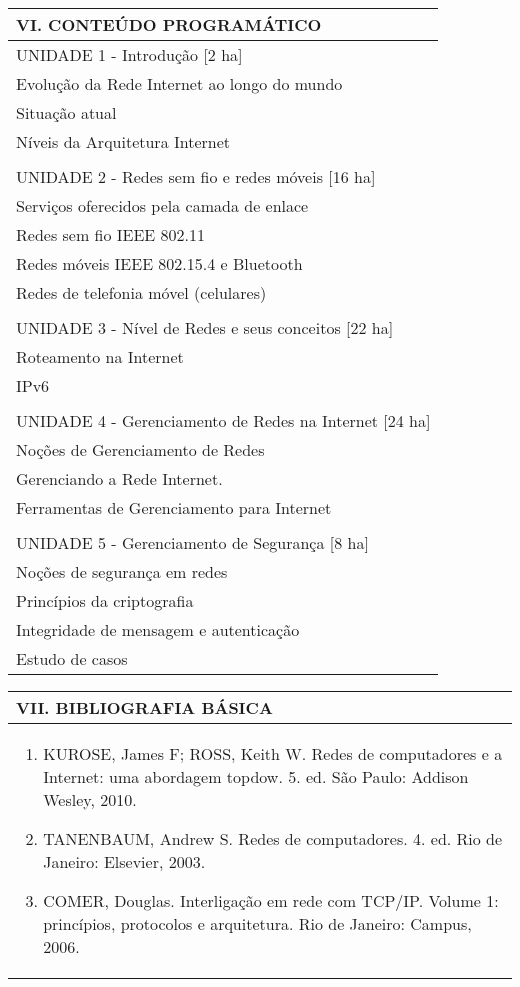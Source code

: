 \documentclass[12pt]{article}
\begin{document}
\begin{longtable}{|L{1.025\textwidth}|} \hline
%
{\bf VI. CONTEÚDO PROGRAMÁTICO } \\ \hline
UNIDADE 1 - Introdução [2 ha]\\
Evolução da Rede Internet ao longo do mundo\\
Situação atual\\
Níveis da Arquitetura Internet\\
\\
UNIDADE 2 - Redes sem fio e redes móveis [16 ha]\\
Serviços oferecidos pela camada de enlace\\
Redes sem fio IEEE 802.11\\
Redes móveis IEEE 802.15.4 e Bluetooth\\
Redes de telefonia móvel (celulares)\\
\\
UNIDADE 3 - Nível de Redes e seus conceitos [22 ha]\\
Roteamento na Internet\\
IPv6\\
\\
UNIDADE 4 - Gerenciamento de Redes na Internet [24 ha]\\
Noções de Gerenciamento de Redes\\
Gerenciando a Rede Internet.\\
Ferramentas de Gerenciamento para Internet\\
\\
UNIDADE 5 - Gerenciamento de Segurança [8 ha]\\
Noções de segurança em redes\\
Princípios da criptografia\\
Integridade de mensagem e autenticação\\
Estudo de casos
\\ \hline
\end{longtable} 





\begin{longtable}{|L{1.025\textwidth}|} \hline
%
{\bf VII. BIBLIOGRAFIA BÁSICA} \\ \hline
\begin{enumerate}
%
\item KUROSE, James F; ROSS, Keith W. Redes de computadores e a Internet: uma abordagem topdow. 5. ed. São Paulo: Addison Wesley, 2010.
\item TANENBAUM, Andrew S. Redes de computadores. 4. ed. Rio de Janeiro: Elsevier, 2003.
\item COMER, Douglas. Interligação em rede com TCP/IP. Volume 1: princípios, protocolos e arquitetura. Rio de Janeiro: Campus, 2006.
%

\end{enumerate}
 \\ \hline
\end{longtable}
\end{document}
